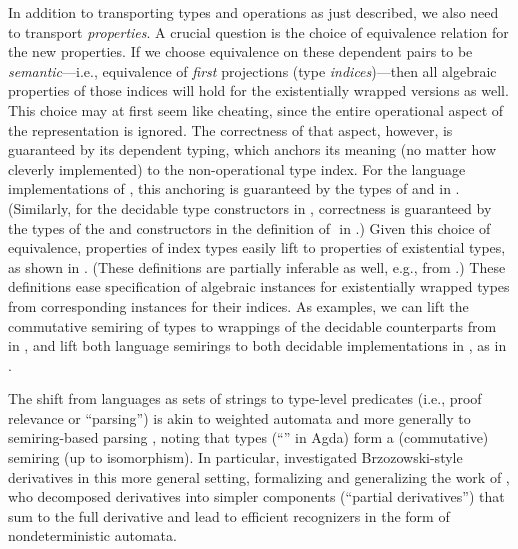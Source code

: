 \documentclass[acmsmall,screen,timestamp]{acmart}  %
\begin{document}
In addition to transporting types and operations as just described, we also need to transport \emph{properties}.
A crucial question is the choice of equivalence relation for the new properties.
If we choose equivalence on these dependent pairs to be \emph{semantic}---i.e., equivalence of \emph{first} projections (type \emph{indices})---then all algebraic properties of those indices will hold for the existentially wrapped versions as well.
This choice may at first seem like cheating, since the entire operational aspect of the representation is ignored.
The correctness of that aspect, however, is guaranteed by its dependent typing, which anchors its meaning (no matter how cleverly implemented) to the non-operational type index.
For the language implementations of , this anchoring is guaranteed by the types of  and  in .
(Similarly, for the decidable type constructors in , correctness is guaranteed by the types of the  and  constructors in the definition of ‌ in .)
Given this choice of equivalence, properties of index types easily lift to properties of existential types, as shown in .
(These definitions are partially inferable as well, e.g., from .)
These definitions ease specification of algebraic instances for existentially wrapped types from corresponding instances for their indices.
\rnc{}
As examples, we can lift the commutative semiring of types to wrappings of the decidable counterparts from  in , and lift both language semirings to both decidable implementations in , as in .



The shift from languages as sets of strings to type-level predicates (i.e., proof relevance or ``parsing'') is akin to weighted automata \citep{Schutzenberger1961, DrosteKuske2019} and more generally to semiring-based parsing \citep{Chomsky1959CFL, Goodman1998PIO, Goodman1999SP, Liu2004}, noting that types (``'' in Agda) form a (commutative) semiring (up to isomorphism).
In particular, \citet{Lombardy2005} investigated Brzozowski-style derivatives in this more general setting, formalizing and generalizing the work of \citet{Antimirov1996}, who decomposed derivatives into simpler components (``partial derivatives'') that sum to the full derivative and lead to efficient recognizers in the form of nondeterministic automata.
\end{document}
